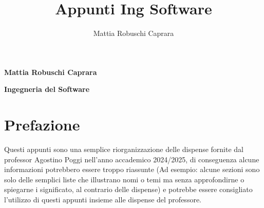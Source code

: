 \documentclass{article}
\title{Appunti Ing Software}
\author{Mattia Robuschi Caprara}
\date{}
\begin{document}
	
	\begin{titlepage}
		
		\pagecolor{CoverGreen}
		
		\vspace{25 mm}
		\begin{center}
			\large
			{\color{black}\textbf{Mattia Robuschi Caprara}} 
		\end{center}
		
		\begin{center}
			\huge
			{\color{black}\textbf{Ingegneria del Software}}
		\end{center}
		
		\vspace{45 mm}
		
		\begin{figure}[h]
			\centering
		\end{figure}
		
		\thispagestyle{empty} 
	\end{titlepage}
	
	\newpage
	\pagecolor{white}
	\section*{Prefazione}
	Questi appunti sono una semplice riorganizzazione delle dispense fornite dal professor Agostino Poggi nell'anno accademico 2024/2025, di conseguenza alcune informazioni potrebbero essere troppo riassunte (Ad esempio: alcune sezioni sono solo delle semplici liste che illustrano nomi o temi ma senza approfondirne o spiegarne i significato, al contrario delle dispense) e potrebbe essere consigliato l'utilizzo di questi appunti insieme alle dispense del professore.
	\tableofcontents
	\newpage
	
\end{document}
